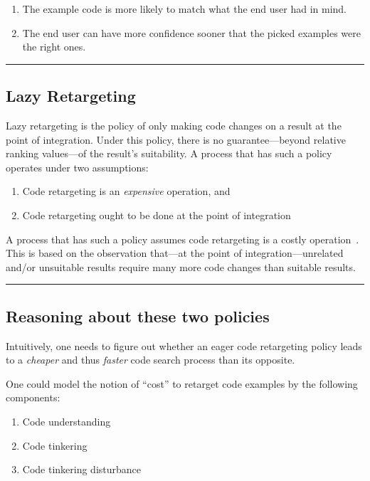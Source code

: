 \begin{enumerate}
	\item The example code is more likely to match what the end user had in mind.
	\item The end user can have more confidence sooner that the picked examples were the right ones.
\end{enumerate}


\fancybreak{\pfbreakdisplay}

\subsection{Lazy Retargeting}

Lazy retargeting is the policy of only making code changes on a result at the point of integration. Under this policy, there is no guarantee---beyond relative ranking values---of the result's suitability. A process that has such a policy operates under two assumptions:

\begin{enumerate}
	\item Code retargeting is an \emph{expensive} operation, and
	\item Code retargeting ought to be done at the point of integration
\end{enumerate}

A process that has such a policy assumes code retargeting is a costly operation~\cite{Brandt:2009ew, Wightman:2012gc}. This is based on the observation that---at the point of integration---unrelated and/or unsuitable results require many more code changes than suitable results.

\fancybreak{\pfbreakdisplay}

\subsection{Reasoning about these two policies}

Intuitively, one needs to figure out whether an eager code retargeting policy leads to a \emph{cheaper} and thus \emph{faster} code search process than its opposite. 

One could model the notion of ``cost'' to retarget code examples by the following components:

\begin{enumerate}
	\item Code understanding
	\item Code tinkering
	\item Code tinkering disturbance
\end{enumerate}
 
